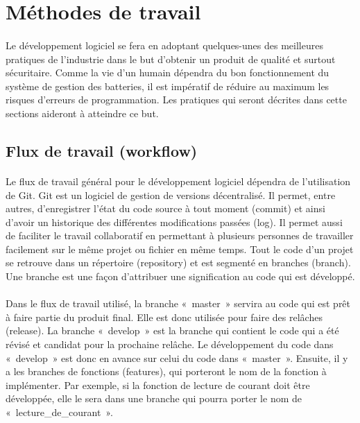 \section{Méthodes de travail}
\paragraph{}
Le développement logiciel se fera en adoptant quelques-unes des meilleures pratiques de l’industrie dans le but d’obtenir un produit de qualité et surtout sécuritaire. Comme la vie d’un humain dépendra du bon fonctionnement du système de gestion des batteries, il est impératif de réduire au maximum les risques d’erreurs de programmation. Les pratiques qui seront décrites dans cette sections aideront à atteindre ce but.

	\subsection{Flux de travail (workflow)}
	\paragraph{}
	Le flux de travail général pour le développement logiciel dépendra de l’utilisation de Git. Git est un logiciel de gestion de versions décentralisé. Il permet, entre autres, d’enregistrer l’état du code source à tout moment (commit) et ainsi d’avoir un historique des différentes modifications passées (log). Il permet aussi de faciliter le travail collaboratif en permettant à plusieurs personnes de travailler facilement sur le même projet ou fichier en même temps. Tout le code d’un projet se retrouve dans un répertoire (repository) et est segmenté en branches (branch). Une branche est une façon d’attribuer une signification au code qui est développé.

	\paragraph{}
	Dans le flux de travail utilisé, la branche « master » servira au code qui est prêt à faire partie du produit final. Elle est donc utilisée pour faire des relâches (release). La branche « develop » est la branche qui contient le code qui a été révisé et candidat pour la prochaine relâche. Le développement du code dans « develop » est donc en avance sur celui du code dans « master ». Ensuite, il y a les branches de fonctions (features), qui porteront le nom de la fonction à implémenter. Par exemple, si la fonction de lecture de courant doit être développée, elle le sera dans une branche qui pourra porter le nom de « lecture\_de\_courant ».

